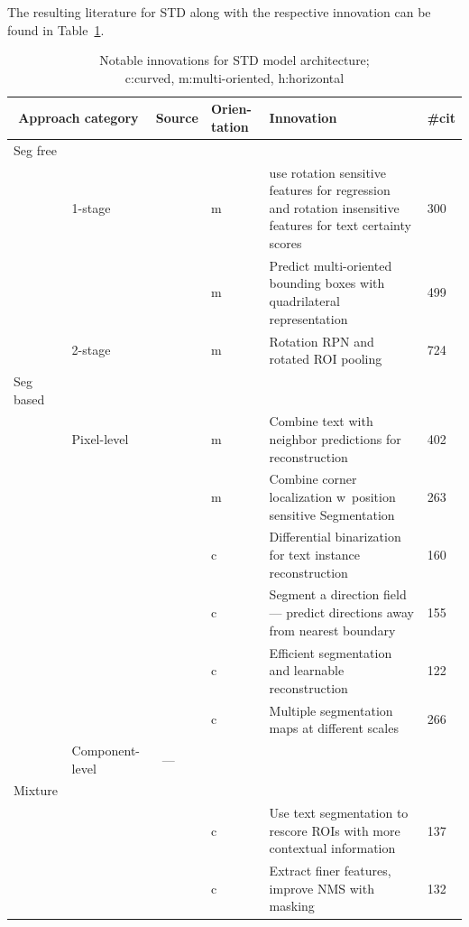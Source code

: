 The resulting literature for \ac{STD} along with the respective innovation can be found in
Table~\ref{tb:STD-steps-properties}.
\begin{table}[h]
    \centering\scriptsize
    \begin{tabular}{p{}p{}p{}p{}
            p{}p{}}
        \multicolumn{2}{c}{\textbf{Approach category}} & \textbf{Source} & \textbf{Orien-tation}
                                                           & \textbf{Innovation} & \textbf{\#cit}\\
        \toprule
        Seg free & & \\
            & 1-stage &~\cite{liao_rotation-sensitive_2018} & m & use rotation sensitive features
                for regression and rotation insensitive features for text certainty scores & 300 \\
            & &~\cite{liao_textboxes_2018} & m & Predict multi-oriented bounding boxes with
                quadrilateral representation & 499 \\
            & 2-stage &~\cite{ma_arbitrary-oriented_2018} & m & Rotation RPN and rotated \ac{ROI}
                pooling & 724 \\
        \midrule
        Seg based & & \\
            & Pixel-level &~\cite{deng_pixellink_2018} & m & Combine text with neighbor predictions for
               reconstruction & 402 \\
            & &~\cite{lyu_multi-oriented_2018} & m & Combine corner localization w\ position sensitive
               Segmentation & 263\\
            & &~\cite{liao_real-time_2019} & c & Differential binarization for
                text instance reconstruction  & 160\\
            & &~\cite{xu_textfield_2019} & c & Segment a direction field --- predict directions away
               from nearest boundary & 155 \\
            & &~\cite{wang_efficient_2019} & c & Efficient segmentation and learnable reconstruction
               & 122 \\
            & &~\cite{wang_shape_2019} & c & Multiple segmentation maps at different scales & 266 \\
            & Component-level &~--- & & & \\
        \midrule
        Mixture & & \\
            & &~\cite{xie_scene_2018} & c & Use text segmentation to rescore \acp{ROI} with more
                contextual information & 137 \\
            & &~\cite{dai_fused_2018} & c & Extract finer features, improve \ac{NMS} with masking
                & 132 \\
        \bottomrule
    \end{tabular}
    \caption[Notable innovations for STD model architecture]{%
        Notable innovations for STD model architecture; \\
        c:curved, m:multi-oriented, h:horizontal\label{tb:STD-steps-properties}
    }
\end{table}
